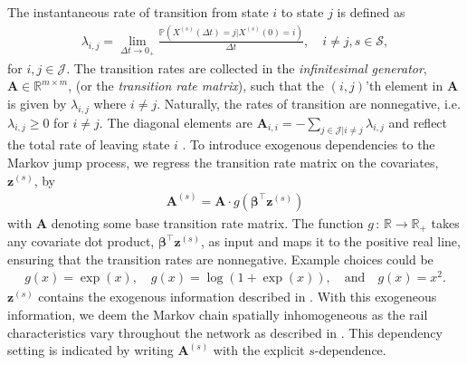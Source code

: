 The instantaneous rate of transition from state $i$ to state $j$ is defined as
\begin{align*}
    \lambda_{i,j} = 
    \lim_{\Delta t \rightarrow 0_+} \frac{ \mathds{P}\left( X^{(s)}(\Delta t) = j | X^{(s)}(0) = i\right)}{\Delta t}, \quad i \neq j, s \in \mathcal S,
\end{align*}
for $i,j \in \mathcal{J}$. The transition rates are collected in the \textit{infinitesimal generator}, $\bm{A} \in \mathbb R^{m \times m}$, (or the \textit{transition rate matrix}), such that the $(i,j)$'th element in $\bm{A}$ is given by $\lambda_{i,j}$ where $i \neq j$. Naturally, the rates of transition are nonnegative, i.e. $\lambda_{i,j} \geq 0$ for $i \neq j$. The diagonal elements are $\bm{A}_{i,i} = -\sum_{j \in \mathcal{J} | i \neq j } \lambda_{i,j}$ and reflect the total rate of leaving state $i$ \citep[Section 1.3]{bladt_nielsen}. 
To introduce exogenous dependencies to the Markov jump process, we regress the transition rate matrix on the covariates, $\bm{z}^{(s)}$, by
\begin{equation}
\begin{aligned}
    \bm{A}^{(s)} = \bm{A} \cdot g\left( \bm{\beta}^\top \bm{z}^{(s)} \right)
\end{aligned} \label{eq:trans_rates_covariates}
\end{equation}
with $\bm{A}$ denoting some base transition rate matrix. The function $g \, : \, \mathbb{R} \rightarrow \mathbb{R_+}$ takes any covariate dot product, $\bm{\beta}^\top \bm{z}^{(s)}$, as input and maps it to the positive real line, ensuring that the transition rates are nonnegative. Example choices could be
\begin{align*}
   g(x) = \exp(x), \quad g(x) = \log(1 + \exp(x) ), \quad \text{and} \quad g(x) = x^2.
\end{align*}
$\bm{z}^{(s)}$ contains the exogenous information described in . With this exogeneous information, we deem the Markov chain spatially inhomogeneous as the rail characteristics vary throughout the network as described in . This dependency setting is indicated by writing $\bm{A}^{(s)}$ with the explicit $s$-dependence.

